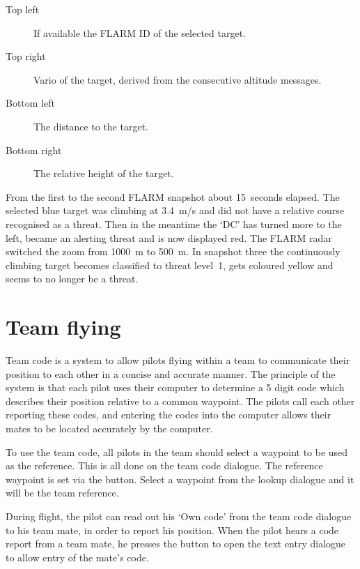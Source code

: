 \begin{description}
\item[Top left]  If available the FLARM ID of the selected target.
\item[Top right]  Vario of the target, derived from the consecutive altitude
messages.
\item[Bottom left]  The distance to the target.
\item[Bottom right]  The relative height of the target.
\end{description}

From the first to the second FLARM snapshot about 15~seconds elapsed. The
selected blue target was climbing at 3.4~m/s and did not have a relative course
recognised as a threat.  Then in the meantime the `DC' has turned more to
the left, became an alerting threat and is now displayed red.  The FLARM
radar switched the zoom from 1000~m to 500~m. In snapshot three the
continuously climbing target becomes classified to threat level~1, gets
coloured yellow and seems to no longer be a threat.


\section{Team flying}\label{sec:team-flying}

Team code is a system to allow pilots flying within a team to 
communicate their position to each other in a concise and accurate 
manner.  The principle of the system is that each pilot uses their 
computer to determine a 5 digit code which describes their position 
relative to a common waypoint.  The pilots call each other reporting 
these codes, and entering the codes into the computer allows their 
mates to be located accurately by the computer. 

To use the team code, all pilots in the team should select a waypoint to 
be used as the reference.  This is all done on the team code dialogue. 
The reference waypoint is set 
via the  button. Select a waypoint from the lookup dialogue 
and it will be the team reference.

During flight, the pilot can read out his `Own code' from the team 
code dialogue to his team mate, in order to report his position.  When 
the pilot hears a code report from a team mate, he presses the  
button to open the text entry dialogue to allow entry of the mate's code.

